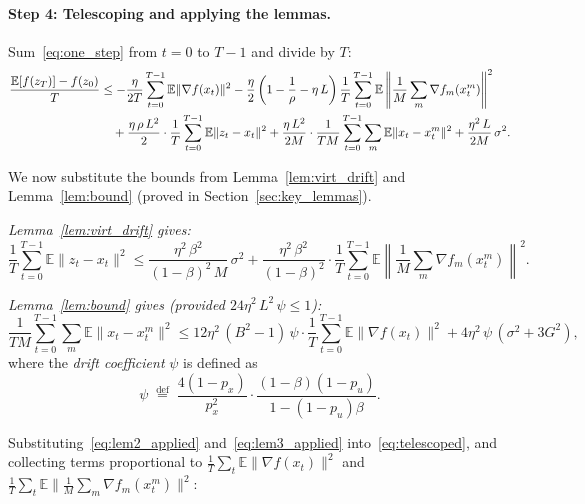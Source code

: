 \documentclass{article}
\begin{document}
\paragraph{Step 4: Telescoping and applying the lemmas.}

Sum~\eqref{eq:one_step} from $t = 0$ to $T-1$ and divide by $T$:
\begin{align}
\frac{\mathbb{E}[f(z_T)] - f(z_0)}{T}
&\leq -\frac{\eta}{2T}\sum_{t=0}^{T-1}\mathbb{E}\|\nabla f(x_t)\|^2
  - \frac{\eta}{2}\left(1 - \frac{1}{\rho} - \eta\,L\right)
    \frac{1}{T}\sum_{t=0}^{T-1}\mathbb{E}\left\|\frac{1}{M}\sum_m
    \nabla f_m(x_t^m)\right\|^2 \notag \\
&\quad+ \frac{\eta\,\rho\,L^2}{2}\cdot
  \frac{1}{T}\sum_{t=0}^{T-1}\mathbb{E}\|z_t - x_t\|^2
  + \frac{\eta\,L^2}{2M}\cdot
  \frac{1}{TM}\sum_{t=0}^{T-1}\sum_m\mathbb{E}\|x_t - x_t^m\|^2
  + \frac{\eta^2\,L}{2M}\,\sigma^2.
\label{eq:telescoped}
\end{align}

We now substitute the bounds from Lemma~\ref{lem:virt_drift} and
Lemma~\ref{lem:bound} (proved in Section~\ref{sec:key_lemmas}).

\medskip
\noindent\emph{Lemma~\ref{lem:virt_drift} gives:}
\begin{equation}
\frac{1}{T}\sum_{t=0}^{T-1}\mathbb{E}\|z_t - x_t\|^2
\leq \frac{\eta^2\,\beta^2}{(1-\beta)^2\,M}\,\sigma^2
  + \frac{\eta^2\,\beta^2}{(1-\beta)^2}\cdot
    \frac{1}{T}\sum_{t=0}^{T-1}\mathbb{E}\left\|\frac{1}{M}\sum_m
    \nabla f_m(x_t^m)\right\|^2.
\label{eq:lem2_applied}
\end{equation}

\noindent\emph{Lemma~\ref{lem:bound} gives (provided $24\eta^2\,L^2\,\psi \leq 1$):}
\begin{equation}
\frac{1}{TM}\sum_{t=0}^{T-1}\sum_m\mathbb{E}\|x_t - x_t^m\|^2
\leq 12\eta^2\,(B^2-1)\,\psi\cdot
  \frac{1}{T}\sum_{t=0}^{T-1}\mathbb{E}\|\nabla f(x_t)\|^2
  + 4\eta^2\,\psi\,(\sigma^2 + 3G^2),
\label{eq:lem3_applied}
\end{equation}
where the \emph{drift coefficient} $\psi$ is defined as
\begin{equation}
\psi \;\stackrel{\text{def}}{=}\;
\frac{4(1-p_x)}{p_x^2}\cdot
\frac{(1-\beta)(1-p_u)}{1-(1-p_u)\beta}.
\label{eq:psi_def}
\end{equation}

Substituting~\eqref{eq:lem2_applied} and~\eqref{eq:lem3_applied}
into~\eqref{eq:telescoped}, and collecting terms proportional to
$\frac{1}{T}\sum_t\mathbb{E}\|\nabla f(x_t)\|^2$ and
$\frac{1}{T}\sum_t\mathbb{E}\|\frac{1}{M}\sum_m\nabla f_m(x_t^m)\|^2$:
\end{document}
